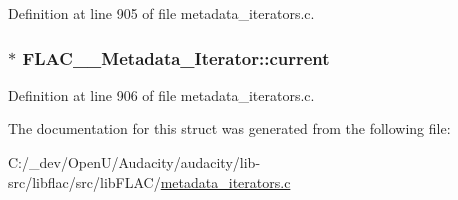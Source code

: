 Definition at line 905 of file metadata\+\_\+iterators.\+c.

\subsubsection[{\texorpdfstring{current}{current}}]{$\ast$ F\+L\+A\+C\+\_\+\+\_\+\+Metadata\+\_\+\+Iterator\+::current}\hypertarget{struct_f_l_a_c_____metadata___iterator_a7fee2cf1081cc26ed13f75058e91afcf}{}\label{struct_f_l_a_c_____metadata___iterator_a7fee2cf1081cc26ed13f75058e91afcf}


Definition at line 906 of file metadata\+\_\+iterators.\+c.



The documentation for this struct was generated from the following file\+:\begin{DoxyCompactItemize}
\item 
C\+:/\+\_\+dev/\+Open\+U/\+Audacity/audacity/lib-\/src/libflac/src/lib\+F\+L\+A\+C/\hyperlink{metadata__iterators_8c}{metadata\+\_\+iterators.\+c}\end{DoxyCompactItemize}
